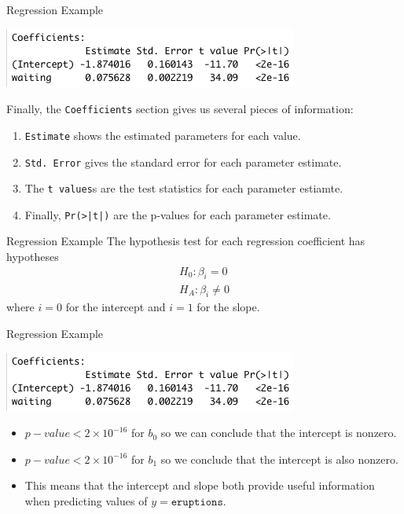 \begin{frame}{Regression Example}
    \begin{center}
        \includegraphics[scale=0.6]{images/regcoef.png}
    \end{center}
    Finally, the \texttt{Coefficients} section gives us several pieces of information:
    \begin{enumerate}
        \item \texttt{Estimate} shows the estimated parameters for each value.
        \item \texttt{Std. Error} gives the standard error for each parameter estimate.
        \item The \texttt{t values}s are the test statistics for each parameter estiamte.
        \item Finally, \texttt{Pr(>|t|)} are the p-values for each parameter estimate.
    \end{enumerate}
\end{frame}

\begin{frame}{Regression Example}
    The hypothesis test for each regression coefficient has hypotheses
    \begin{align*}
        H_0: \beta_i = 0 \\
        H_A: \beta_i \ne 0
    \end{align*}
    where $i=0$ for the intercept and $i=1$ for the slope.
\end{frame}

\begin{frame}{Regression Example}
    \begin{center}
        \includegraphics[scale=0.6]{images/regcoef.png}
    \end{center}
    \begin{itemize}
        \item $p-value < 2\times10^{-16}$ for $b_0$ so we can conclude that the intercept is nonzero.
        \item $p-value < 2\times10^{-16}$ for $b_1$ so we conclude that the intercept is also nonzero.
        \item This means that the intercept and slope both provide useful information when predicting values of $y=\texttt{eruptions}$.
    \end{itemize} 
\end{frame}

